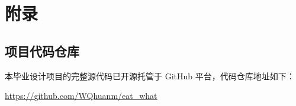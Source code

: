 \chapter*{附\quad 录}

\section*{项目代码仓库}

本毕业设计项目的完整源代码已开源托管于 GitHub 平台，代码仓库地址如下：

\uline{\href{https://github.com/WQhuanm/eat_what}{https://github.com/WQhuanm/eat\string_what}}

